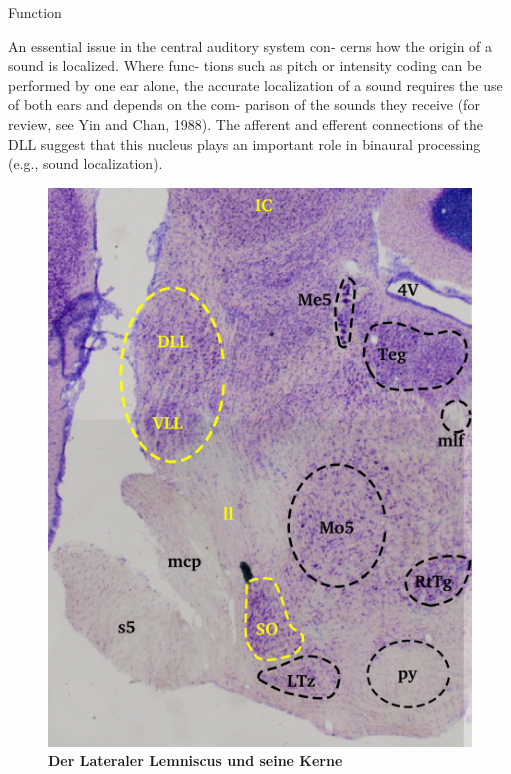 \documentclass[12pt,a4paper,pdftex]{article}
\begin{document}
Function

An essential issue in the central auditory system con-
cerns how the origin of a sound is localized. Where func-
tions such as pitch or intensity coding can be performed
by one ear alone, the accurate localization of a sound
requires the use of both ears and depends on the com-
parison of the sounds they receive (for review, see Yin and
Chan, 1988). The afferent and efferent connections of the
DLL suggest that this nucleus plays an important role in
binaural processing (e.g., sound localization).

\begin{figure}[H]
    \centering
    \includegraphics{pictures/auditory/lateral_lemniscus.png}
    \caption[Der Lateraler Lemniscus und seine Kerne]{\textbf{Der Lateraler Lemniscus und seine Kerne}\\
    }
    \label{fig:lateraler_lemniscus}
\end{figure}
\end{document}
